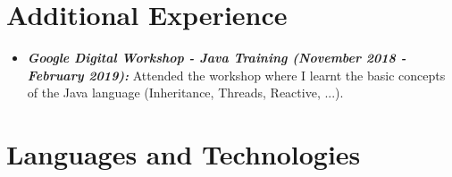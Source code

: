 \documentclass{article}
\begin{document}
    \section*{Additional Experience}
        \begin{itemize}
            \item \footnotesize \textbf{\textit{Google Digital Workshop - Java Training (November 2018 - February 2019):}} Attended the workshop where I learnt the basic concepts of the Java language (Inheritance, Threads, Reactive, ...). 
        \end{itemize}
    
    \section*{Languages and Technologies}
\end{document}
